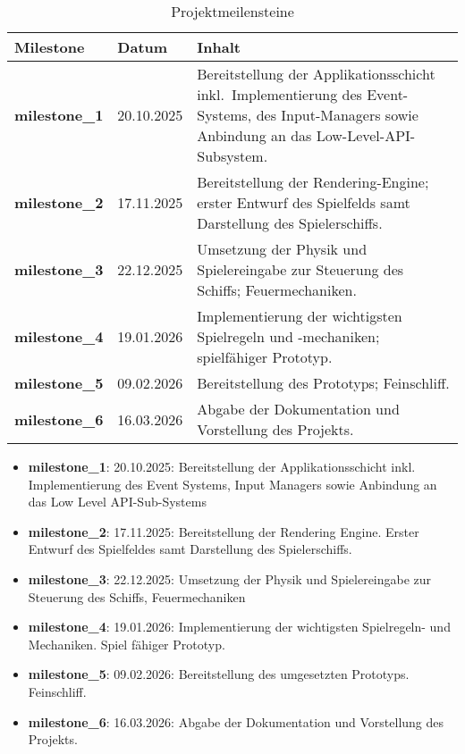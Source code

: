 \begin{table*}[!t]
    \centering
    \caption{Projektmeilensteine}
    \label{tab:meilensteine}
    \renewcommand{\arraystretch}{1.15}
    \begin{tabularx}{\textwidth}{@{}l l Y@{}}
        \toprule
        \textbf{Milestone} & \textbf{Datum} & \textbf{Inhalt} \\
        \midrule
        \textbf{milestone\_1} & 20.10.2025 & Bereitstellung der Applikationsschicht inkl.\ Implementierung des Event-Systems, des Input-Managers sowie Anbindung an das Low-Level-API-Subsystem. \\
        \textbf{milestone\_2} & 17.11.2025 & Bereitstellung der Rendering-Engine; erster Entwurf des Spielfelds samt Darstellung des Spielerschiffs. \\
        \textbf{milestone\_3} & 22.12.2025 & Umsetzung der Physik und Spielereingabe zur Steuerung des Schiffs; Feuermechaniken. \\
        \textbf{milestone\_4} & 19.01.2026 & Implementierung der wichtigsten Spielregeln und -mechaniken; spielfähiger Prototyp. \\
        \textbf{milestone\_5} & 09.02.2026 & Bereitstellung des Prototyps; Feinschliff. \\
        \textbf{milestone\_6} & 16.03.2026 & Abgabe der Dokumentation und Vorstellung des Projekts. \\
        \bottomrule
    \end{tabularx}
\end{table*}



\vspace{2mm}
\begin{itemize}
    \itemsep0.5em
    \item \textbf{milestone\_1}: 20.10.2025: Bereitstellung der Applikationsschicht inkl. Implementierung des Event
    Systems, Input Managers sowie Anbindung an das Low Level API-Sub-Systems
    \item \textbf{milestone\_2}: 17.11.2025: Bereitstellung der Rendering Engine. Erster Entwurf des Spielfeldes
    samt Darstellung des Spielerschiffs.
    \item \textbf{milestone\_3}: 22.12.2025: Umsetzung der Physik und Spielereingabe zur Steuerung des Schiffs,
    Feuermechaniken
    \item \textbf{milestone\_4}: 19.01.2026: Implementierung der wichtigsten Spielregeln- und Mechaniken. Spiel
    fähiger Prototyp.
    \item \textbf{milestone\_5}: 09.02.2026: Bereitstellung des umgesetzten Prototyps. Feinschliff.
    \item \textbf{milestone\_6}: 16.03.2026: Abgabe der Dokumentation und Vorstellung des Projekts.
\end{itemize}
\vspace{2mm}

